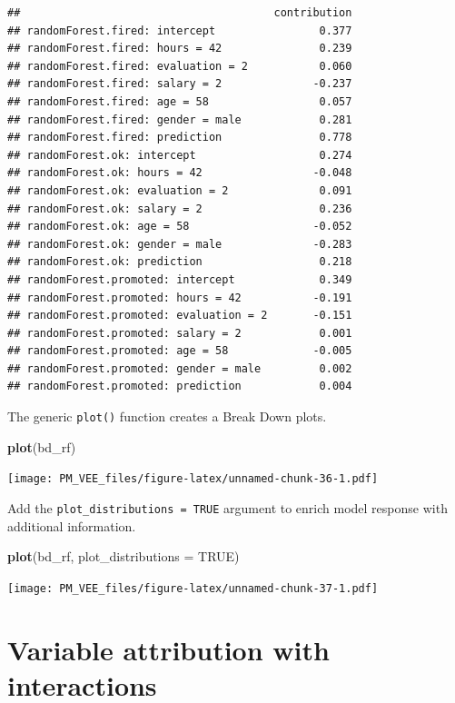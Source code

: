 \documentclass[]{krantz}
\newenvironment{Shaded}{\begin{snugshade}}{\end{snugshade}}
\newcommand{\DataTypeTok}[1]{\textcolor[rgb]{0.13,0.29,0.53}{#1}}
\newcommand{\KeywordTok}[1]{\textcolor[rgb]{0.13,0.29,0.53}{\textbf{#1}}}
\newcommand{\NormalTok}[1]{#1}
\newcommand{\OtherTok}[1]{\textcolor[rgb]{0.56,0.35,0.01}{#1}}
\theoremstyle{definition}
\theoremstyle{definition}
\theoremstyle{definition}
\theoremstyle{remark}
\begin{document}
\begin{verbatim}
##                                       contribution
## randomForest.fired: intercept                0.377
## randomForest.fired: hours = 42               0.239
## randomForest.fired: evaluation = 2           0.060
## randomForest.fired: salary = 2              -0.237
## randomForest.fired: age = 58                 0.057
## randomForest.fired: gender = male            0.281
## randomForest.fired: prediction               0.778
## randomForest.ok: intercept                   0.274
## randomForest.ok: hours = 42                 -0.048
## randomForest.ok: evaluation = 2              0.091
## randomForest.ok: salary = 2                  0.236
## randomForest.ok: age = 58                   -0.052
## randomForest.ok: gender = male              -0.283
## randomForest.ok: prediction                  0.218
## randomForest.promoted: intercept             0.349
## randomForest.promoted: hours = 42           -0.191
## randomForest.promoted: evaluation = 2       -0.151
## randomForest.promoted: salary = 2            0.001
## randomForest.promoted: age = 58             -0.005
## randomForest.promoted: gender = male         0.002
## randomForest.promoted: prediction            0.004
\end{verbatim}

The generic \texttt{plot()} function creates a Break Down plots.

\begin{Shaded}
\begin{Highlighting}[]
\KeywordTok{plot}\NormalTok{(bd_rf) }
\end{Highlighting}
\end{Shaded}

\texttt{[image: PM\_VEE\_files/figure-latex/unnamed-chunk-36-1.pdf]}

Add the \texttt{plot\_distributions\ =\ TRUE} argument to enrich model
response with additional information.

\begin{Shaded}
\begin{Highlighting}[]
\KeywordTok{plot}\NormalTok{(bd_rf, }\DataTypeTok{plot_distributions =} \OtherTok{TRUE}\NormalTok{) }
\end{Highlighting}
\end{Shaded}

\texttt{[image: PM\_VEE\_files/figure-latex/unnamed-chunk-37-1.pdf]}

\hypertarget{variable-attribution-with-interactions}{%
\section{Variable attribution with
interactions}\label{variable-attribution-with-interactions}}
\end{document}

